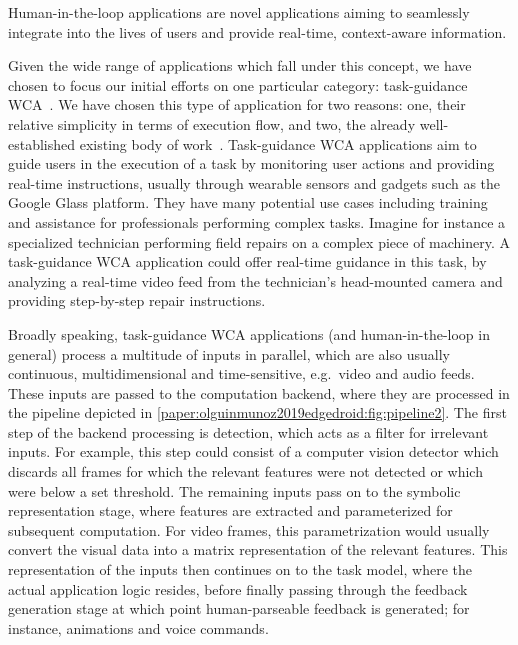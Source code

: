 Human-in-the-loop applications are novel applications aiming to seamlessly integrate into the lives of users and provide real-time, context-aware information.

Given the wide range of applications which fall under this concept, we have chosen to focus our initial efforts on one particular category: task-guidance \gls{WCA}~\cite{ha2014towards}.
We have chosen this type of application for two reasons: one, their relative simplicity in terms of execution flow, and two, the already well-established existing body of work~\cite{ha2014towards,chen2015early,chen2017empirical}.
Task-guidance \gls{WCA} applications aim to guide users in the execution of a task by monitoring user actions and providing real-time instructions, usually through wearable sensors and gadgets such as the Google Glass platform.
They have many potential use cases including training and assistance for professionals performing complex tasks.
Imagine for instance a specialized technician performing field repairs on a complex piece of machinery.
A task-guidance \gls{WCA} application could offer real-time guidance in this task, by analyzing a real-time video feed from the technician's head-mounted camera and providing step-by-step repair instructions.

Broadly speaking, task-guidance \gls{WCA} applications (and human-in-the-loop in general) process a multitude of inputs in parallel, which are also usually continuous, multidimensional and time-sensitive, e.g.\ video and audio feeds.
These inputs are passed to the computation backend, where they are processed in the pipeline depicted in \cref{paper:olguinmunoz2019edgedroid:fig:pipeline2}.
The first step of the backend processing is detection, which acts as a filter for irrelevant inputs.
For example, this step could consist of a computer vision detector which discards all frames for which the relevant features were not detected or which were below a set threshold.
The remaining inputs pass on to the symbolic representation stage, where features are extracted and parameterized for subsequent computation.
For video frames, this parametrization would usually convert the visual data into a matrix representation of the  relevant features.
This representation of the inputs then continues on to the task model, where the actual application logic resides, before finally passing through the feedback generation stage at which point human-parseable feedback is generated; for instance, animations and voice commands.

